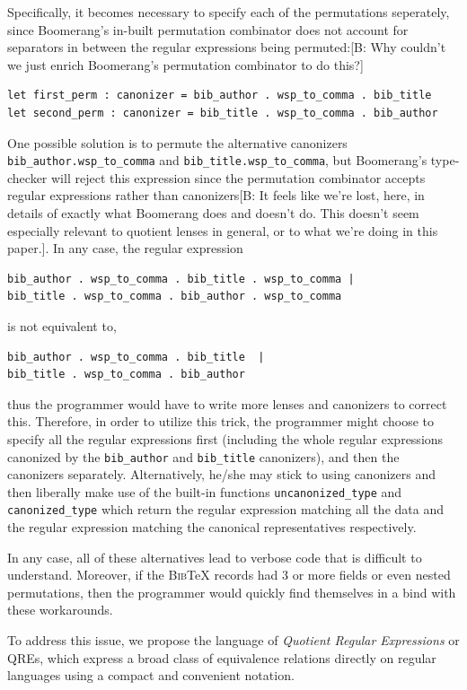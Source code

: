 \documentclass{svproc}
\newcommand{\cd}[1]{\lstinline[backgroundcolor=\color{white}]$#1$}
\newcommand{\FINISH}[3]{\ifdraft\textcolor{#1}{[#2: #3]}\fi}
\newcommand{\bcp}[1]{\FINISH{dkred}{B}{#1}}
\newcommand{\bibtex}{\textsc{Bib}\TeX{}}
\begin{document}
Specifically, it becomes necessary to specify each of the permutations
seperately, since Boomerang's in-built permutation combinator does not account
for separators in between the regular expressions being permuted:\bcp{Why
  couldn't we just enrich Boomerang's permutation combinator to do this?}

\begin{lstlisting}
let first_perm : canonizer = bib_author . wsp_to_comma . bib_title
let second_perm : canonizer = bib_title . wsp_to_comma . bib_author
\end{lstlisting}

One possible solution is to permute the alternative canonizers
\cd{bib_author.wsp_to_comma} and \cd{bib_title.wsp_to_comma},
but Boomerang's type-checker will reject this expression since the permutation
combinator accepts regular expressions rather than canonizers\bcp{It feels
  like we're lost, here, in details of exactly what Boomerang does and
  doesn't do.  This doesn't seem especially relevant to quotient lenses in
  general, or to what we're doing in this paper.}. In any case, the
regular expression
\begin{lstlisting}
bib_author . wsp_to_comma . bib_title . wsp_to_comma | 
bib_title . wsp_to_comma . bib_author . wsp_to_comma
\end{lstlisting}
is not equivalent to,
\begin{lstlisting}
bib_author . wsp_to_comma . bib_title  | 
bib_title . wsp_to_comma . bib_author
\end{lstlisting}
thus the programmer would have to write more lenses and canonizers to correct
this. Therefore, in order to utilize this trick, the programmer might choose to
specify all the regular expressions first (including the whole regular
expressions canonized by the \cd{bib_author} and \cd{bib_title}
canonizers), and then the canonizers separately. Alternatively, he/she may stick
to using canonizers and then liberally make use of the built-in
functions \cd{uncanonized_type} and \cd{canonized_type} which return the
regular expression matching all the data and the regular expression matching
the canonical representatives respectively.

In any case, all of these alternatives lead to verbose code that is
difficult to understand. Moreover, if the \bibtex{} records had 3 or more
fields or even nested permutations, then the programmer would quickly find
themselves in a bind with these workarounds.

To address this issue, we propose the language of {\em Quotient Regular
Expressions} or QREs, which express a broad class of equivalence relations
directly on regular languages using a compact and convenient notation. 
\end{document}
